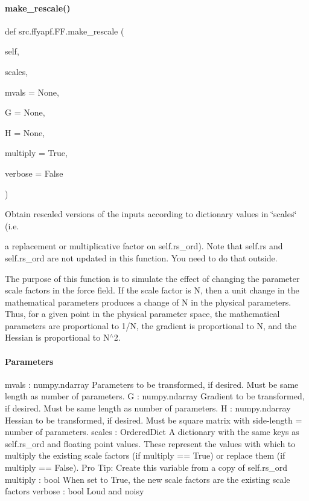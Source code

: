 \paragraph{\texorpdfstring{make\+\_\+rescale()}{make\_rescale()}}
{\footnotesize\ttfamily def src.\+ffyapf.\+F\+F.\+make\+\_\+rescale (\begin{DoxyParamCaption}\item[{}]{self,  }\item[{}]{scales,  }\item[{}]{mvals = {\ttfamily None},  }\item[{}]{G = {\ttfamily None},  }\item[{}]{H = {\ttfamily None},  }\item[{}]{multiply = {\ttfamily True},  }\item[{}]{verbose = {\ttfamily False} }\end{DoxyParamCaption})}



Obtain rescaled versions of the inputs according to dictionary values in \char`\"{}scales\char`\"{} (i.\+e. 

a replacement or multiplicative factor on self.\+rs\+\_\+ord). Note that self.\+rs and self.\+rs\+\_\+ord are not updated in this function. You need to do that outside.

The purpose of this function is to simulate the effect of changing the parameter scale factors in the force field. If the scale factor is N, then a unit change in the mathematical parameters produces a change of N in the physical parameters. Thus, for a given point in the physical parameter space, the mathematical parameters are proportional to 1/N, the gradient is proportional to N, and the Hessian is proportional to N$^\wedge$2.

\paragraph*{Parameters }

mvals \+: numpy.\+ndarray Parameters to be transformed, if desired. Must be same length as number of parameters. G \+: numpy.\+ndarray Gradient to be transformed, if desired. Must be same length as number of parameters. H \+: numpy.\+ndarray Hessian to be transformed, if desired. Must be square matrix with side-\/length = number of parameters. scales \+: Ordered\+Dict A dictionary with the same keys as self.\+rs\+\_\+ord and floating point values. These represent the values with which to multiply the existing scale factors (if multiply == True) or replace them (if multiply == False). Pro Tip\+: Create this variable from a copy of self.\+rs\+\_\+ord multiply \+: bool When set to True, the new scale factors are the existing scale factors verbose \+: bool Loud and noisy


